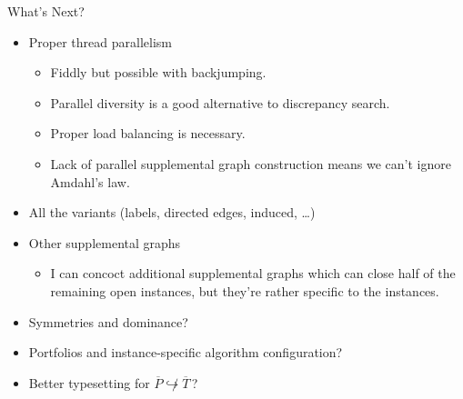 \documentclass{beamer}
\begin{document}
\begin{frame}{What's Next?}
     {
        \begin{itemize}
            \item Proper thread parallelism
                \begin{itemize}
                    \item Fiddly but possible with backjumping.
                    \item Parallel diversity is a good alternative to discrepancy search.
                    \item Proper load balancing is necessary.
                    \item Lack of parallel supplemental graph construction means we can't ignore
                        Amdahl's law.
                \end{itemize}
        \end{itemize}
    }

     {
        \begin{itemize}
            \item All the variants (labels, directed edges, induced, \ldots)
            \item Other supplemental graphs
                \begin{itemize}
                    \item I can concoct additional supplemental graphs which can close half of the
                        remaining open instances, but they're rather specific to the instances.
                \end{itemize}
            \item Symmetries and dominance?
            \item Portfolios and instance-specific algorithm configuration?
        \end{itemize}
    }

     {
        \begin{itemize}
            \item Better typesetting for $\overline{P} \not\hookrightarrow \overline{T}\,$?
        \end{itemize}
    }
\end{frame}
\end{document}
